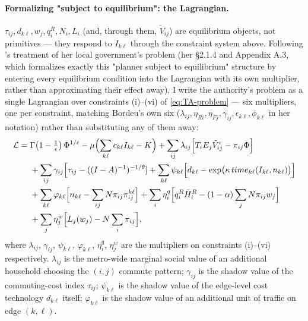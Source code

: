 \documentclass[12pt, a4paper]{article}
\theoremstyle{definition}
\theoremstyle{remark}
\begin{document}
\paragraph{Formalizing "subject to equilibrium": the Lagrangian.} $\tau_{ij},d_{k\ell},w_j,q_i^R,N_i,L_i$ (and, through them, $\tilde V_{ij}$) are equilibrium objects, not primitives — they respond to $I_{k\ell}$ through the constraint system above. Following \citet{Bordeu2026-df}'s treatment of her local government's problem (her \S2.1.4 and Appendix A.3, which formalizes exactly this "planner subject to equilibrium" structure by entering every equilibrium condition into the Lagrangian with its own multiplier, rather than approximating their effect away), I write the authority's problem as a single Lagrangian over constraints (i)--(vi) of \eqref{eq:TA-problem} — six multipliers, one per constraint, matching Bordeu's own six ($\lambda_{ij},\eta_{Ri},\eta_{Fj},\gamma_{ij},\epsilon_{k\ell},\phi_{k\ell}$ in her notation) rather than substituting any of them away:
\begin{align}
    \label{eq:TA-lagrangian}
\mathcal{L} = {}& \Gamma\!\left(1-\tfrac1\epsilon\right)\Phi^{1/\epsilon} - \mu\Bigl(\sum_{k\ell}c_{k\ell}I_{k\ell}-K\Bigr) + \sum_{ij}\lambda_{ij}\Bigl[T_iE_j\tilde V_{ij}^\epsilon - \pi_{ij}\Phi\Bigr] \nonumber\\
&+ \sum_{ij}\gamma_{ij}\Bigl[\tau_{ij}-((I-A)^{-1})^{-1/\theta}] + \sum_{k\ell}\psi_{k\ell}\Bigl[d_{k\ell}-\exp\bigl(\kappa\,time_{k\ell}(I_{k\ell},n_{k\ell})\bigr)\Bigr] \nonumber\\
&+ \sum_{k\ell}\varphi_{k\ell}\Bigl[n_{k\ell}-\sum_{ij}N\pi_{ij}\pi_{ij}^{k\ell}\Bigr] + \sum_i\eta_i^q\Bigl[q_i^R\bar H_i^R-(1-\alpha)\sum_jN\pi_{ij}w_j\Bigr] \nonumber\\
&+ \sum_j\eta_j^w\Bigl[L_j(w_j)-N\sum_i\pi_{ij}\Bigr],
\end{align}
where $\lambda_{ij}$, $\gamma_{ij}$, $\psi_{k\ell}$, $\varphi_{k\ell}$, $\eta_i^q$, $\eta_j^w$ are the multipliers on constraints (i)--(vi) respectively. $\lambda_{ij}$ is the metro-wide marginal social value of an additional household choosing the $(i,j)$ commute pattern; $\gamma_{ij}$ is the shadow value of the commuting-cost index $\tau_{ij}$; $\psi_{k\ell}$ is the shadow value of the edge-level cost technology $d_{k\ell}$ itself; $\varphi_{k\ell}$ is the shadow value of an additional unit of traffic on edge $(k,\ell)$.
\end{document}

